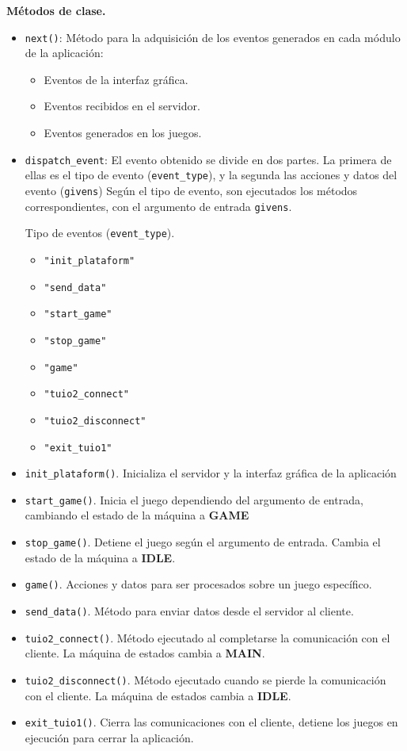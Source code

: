 \textbf{Métodos de clase.}
\begin{itemize}
\item \texttt{next()}: Método para la adquisición de los eventos generados en cada módulo de la aplicación:
\begin{itemize} 
\item Eventos de la interfaz gráfica.
\item Eventos recibidos en el servidor.
\item Eventos generados en los juegos.
\end{itemize}
\item \texttt{dispatch\_event}: El evento obtenido se divide en dos partes. La primera de ellas es el tipo de evento (\texttt{event\_type}), y la segunda las acciones y datos del evento (\texttt{givens})
Según el tipo de evento, son ejecutados los métodos correspondientes, con el argumento de entrada \texttt{givens}.

Tipo de eventos (\texttt{event\_type}).
\begin{itemize}
\item \texttt{"init\_plataform"}
\item \texttt{"send\_data"}
\item \texttt{"start\_game"}
\item \texttt{"stop\_game"}
\item \texttt{"game"}
\item \texttt{"tuio2\_connect"}
\item \texttt{"tuio2\_disconnect"}
\item \texttt{"exit\_tuio1"}
\end{itemize}
\item \texttt{init\_plataform()}. Inicializa el servidor y la interfaz gráfica de la aplicación
\item \texttt{start\_game()}. Inicia el juego dependiendo del argumento de entrada, cambiando el estado de la máquina a \textbf{GAME}
\item \texttt{stop\_game()}. Detiene el juego según el argumento de entrada. Cambia el estado de la máquina a \textbf{IDLE}.
\item \texttt{game()}. Acciones y datos para ser procesados sobre un juego específico.
\item \texttt{send\_data()}. Método para enviar datos desde el servidor al cliente.
\item \texttt{tuio2\_connect()}. Método ejecutado al completarse la comunicación con el cliente. La máquina de estados cambia a \textbf{MAIN}.
\item \texttt{tuio2\_disconnect()}. Método ejecutado cuando se pierde la comunicación con el cliente. La máquina de estados cambia a \textbf{IDLE}.
\item \texttt{exit\_tuio1()}. Cierra las comunicaciones con el cliente, detiene los juegos en ejecución para cerrar la aplicación.
\end{itemize}

